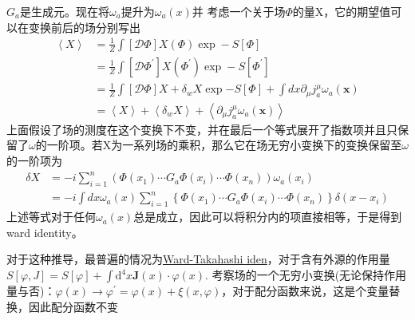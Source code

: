 \documentclass[10pt,openany]{book}
\theoremstyle{thmstyle} %
\theoremstyle{defstyle} %
\theoremstyle{prostyle} %
\begin{document}
$ G_a $是生成元。现在将$ \omega_a $提升为$ \omega_a(x) $并 考虑一个关于场$ \Phi $的量X，它的期望值可以在变换前后的场分别写出
\begin{equation}
    \begin{aligned}
    \left\langle X \right\rangle & =\frac{1}{Z} \int[\mathcal{D} \Phi] X(\Phi) \exp -S[\Phi] \\
    & =\frac{1}{Z} \int\left[\mathcal{D} \Phi^{\prime}\right] X(\Phi^{\prime}) \exp -S\left[\Phi^{\prime}\right] \\
    & =\frac{1}{Z} \int[\mathcal{D} \Phi] X+\delta_w X \exp {-S[\Phi]+\int d x \partial_\mu j_a^\mu \omega_a(\boldsymbol{x})} \\
    & =\left\langle X \right\rangle + \left\langle \delta_w X \right\rangle +\left\langle \partial_\mu j_a^\mu \omega_a(\boldsymbol{x}) \right\rangle
    \end{aligned}
\end{equation}
上面假设了场的测度在这个变换下不变，并在最后一个等式展开了指数项并且只保留了$ \omega $的一阶项。若X为一系列场的乘积，那么它在场无穷小变换下的变换保留至$ \omega $的一阶项为
\begin{equation}
  \begin{aligned}
    \delta X & =-i \sum_{i=1}^n\left(\Phi\left(x_1\right) \cdots G_a \Phi\left(x_i\right) \cdots \Phi\left(x_n\right)\right) \omega_a\left(x_i\right) \\
    & =-i \int d x \omega_a(x) \sum_{i=1}^n\left\{\Phi\left(x_1\right) \cdots G_a \Phi\left(x_i\right) \cdots \Phi\left(x_n\right)\right\} \delta\left(x-x_i\right)
    \end{aligned}
\end{equation}
上述等式对于任何$ \omega_a(x) $总是成立，因此可以将积分内的项直接相等，于是得到ward identity。
\begin{center}

\end{center}
对于这种推导，最普遍的情况为\href{https://edu.fjfi.cvut.cz/studijni-materialy/Ing/Statnice/KTP/Quantum_Field_Theory_III.pdf}{Ward-Takahashi iden}，对于含有外源的作用量$ S[\varphi, J]=S[\varphi]+\int \mathrm{d}^4 x \boldsymbol{J}(x) \cdot \varphi(x) . $ 考察场的一个无穷小变换(无论保持作用量与否)：$ \varphi(x) \rightarrow \varphi^{\prime} = \varphi(x)+\xi(x, \varphi) $，对于配分函数来说，这是个变量替换，因此配分函数不变 
\end{document}
